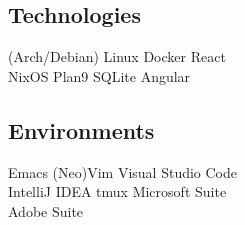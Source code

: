 \documentclass[letterpaper]{deedy-resume} %
\begin{document}
\begin{minipage}[t]{0.33\textwidth}
\subsection{Technologies}

(Arch/Debian) Linux  \textbullet{} Docker \textbullet{} React \\

NixOS \textbullet{} Plan9 \textbullet{} SQLite \textbullet{} Angular \\

\sectionspace %

\subsection{Environments}

Emacs \textbullet{} (Neo)Vim \textbullet{} Visual Studio Code \\
\textbullet{} IntelliJ IDEA \textbullet{} tmux \textbullet{} Microsoft Suite \\
\textbullet{} Adobe Suite

\end{minipage} %
\hfill
%
%
\end{document}
